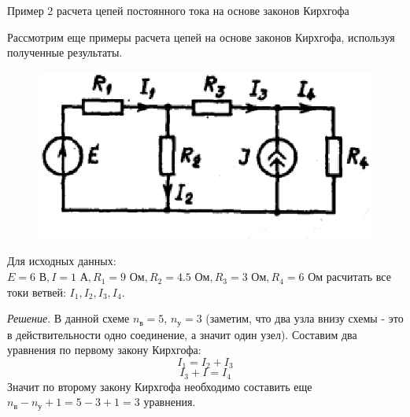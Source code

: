 \documentclass[10pt, pdf, hyperref={unicode},handout]{beamer}
\begin{document}
\begin{frame}{Пример 2  расчета цепей постоянного тока на основе законов Кирхгофа}
  \begin{block}

    \small{

      Рассмотрим еще примеры расчета цепей на основе законов Кирхгофа, используя полученные результаты.
      \begin{figure}[htb] 
    \centering
    \includegraphics [scale=0.9]{ris10.eps}
  \end{figure}
  Для исходных данных: $E=6 \text{ В}, I=1\text{ А}, R_1=9\text{ Ом}, R_2=4.5\text{ Ом}, R_3=3\text{ Ом}, R_4=6\text{ Ом}$ расчитать все токи ветвей: $I_1, I_2, I_3, I_4$.

  \textit{Решение}. В данной схеме $n_{\text{в}}=5$, $n_{\text{у}}=3$ (заметим, что два узла внизу схемы - это в действительности одно соединение, а значит один узел). Составим два уравнения по первому закону Кирхгофа:
  $$I_1=I_2+I_3$$
  $$I_3+I=I_4$$
  Значит по второму закону Кирхгофа необходимо составить еще $n_{\text{в}}-n_{\text{у}}+1=5-3+1=3$ уравнения.
  
  
}
  \end{block}
  
\end{frame}
\end{document}
